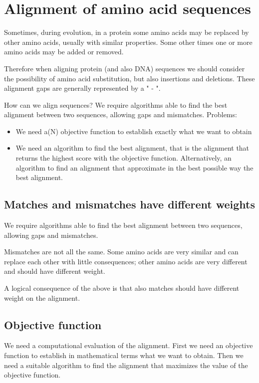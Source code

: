 \section{Alignment of amino acid sequences}

Sometimes, during evolution, in a protein some amino acids may be replaced 
by other amino acids, usually with similar properties. Some other times one or 
more amino acids may be added or removed. 

Therefore when aligning protein (and also DNA) sequences we should consider 
the possibility of amino acid substitution, but also insertions and deletions.
These alignment gaps are generally represented by a " - ".

How can we align sequences?
We require algorithms able to find the best alignment between two sequences,
allowing gaps and mismatches.
Problems:
\begin{itemize}
  \item We need a(N) objective function to establish exactly what we want to 
obtain
  \item We need an algorithm to find the best alignment, that is the alignment
that returns the highest score with the objective function. Alternatively, an
algorithm to find an alignment that approximate in the best possible way the
best alignment.
\end{itemize}

\subsection{Matches and mismatches have different weights}

We require algorithms able to find the best alignment between two sequences,
allowing gaps and mismatches.

Mismatches are not all the same. Some amino acids are very similar and can 
replace each other with little consequences; other amino acids are very different 
and should have different weight.

A logical consequence of the above is that also matches should have different 
weight on the alignment.

\subsection{Objective function}

We need a computational evaluation of the alignment. First we need an objective 
function to establish in mathematical terms what we want to obtain. 
Then we need a suitable algorithm to find the alignment that maximizes the 
value of the objective function.

